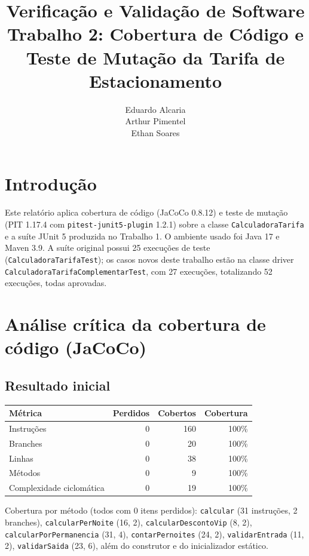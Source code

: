 \documentclass[11pt,a4paper]{article}
\title{Verificação e Validação de Software \\ \large Trabalho 2: Cobertura de Código e Teste de Mutação da Tarifa de Estacionamento}
\author{Eduardo Alcaria \\ Arthur Pimentel \\ Ethan Soares}
\date{}
\begin{document}
\maketitle
\vspace{-2.5em}

\section*{Introdução}

Este relatório aplica cobertura de código (JaCoCo 0.8.12) e teste de mutação
(PIT 1.17.4 com \texttt{pitest-junit5-plugin} 1.2.1) sobre a classe
\texttt{CalculadoraTarifa} e a suíte JUnit 5 produzida no Trabalho 1. O ambiente
usado foi Java 17 e Maven 3.9. A suíte original possui 25 execuções de teste
(\texttt{CalculadoraTarifaTest}); os casos novos deste trabalho estão na classe
driver \texttt{CalculadoraTarifaComplementarTest}, com 27 execuções, totalizando
52 execuções, todas aprovadas.

\section{Análise crítica da cobertura de código (JaCoCo)}

\subsection{Resultado inicial}

\begin{center}
\begin{tabular}{lrrr}
\toprule
Métrica & Perdidos & Cobertos & Cobertura \\
\midrule
Instruções & 0 & 160 & 100\% \\
Branches & 0 & 20 & 100\% \\
Linhas & 0 & 38 & 100\% \\
Métodos & 0 & 9 & 100\% \\
Complexidade ciclomática & 0 & 19 & 100\% \\
\bottomrule
\end{tabular}
\end{center}

Cobertura por método (todos com 0 itens perdidos): \texttt{calcular} (31
instruções, 2 branches), \texttt{calcularPerNoite} (16, 2),
\texttt{calcularDescontoVip} (8, 2), \texttt{calcularPorPermanencia} (31, 4),
\texttt{contarPernoites} (24, 2), \texttt{validarEntrada} (11, 2),
\texttt{validarSaida} (23, 6), além do construtor e do inicializador estático.
\end{document}
